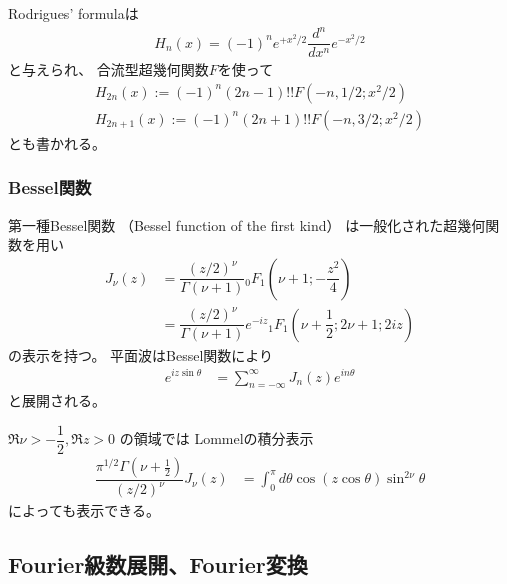 Rodrigues' formulaは
\begin{align}
    H_n(x)
    =
    (-1)^n e^{ + x^2 / 2 }
    \dfrac{d^n}{dx^n}
    e^{ - x^2 / 2 }
\label{hermite rodrigues formula}
\end{align}
と与えられ、
合流型超幾何関数$F$を使って
\begin{subequations}
\begin{align}
    H_{2n}(x)
    :=
        (-1)^n
        (2 n - 1)!!
    F(-n, 1/2; x^2/2)
\\
    H_{2n+1}(x)
    :=
        (-1)^n
        (2 n + 1)!!
    F(-n, 3/2; x^2/2)
\end{align}
\end{subequations}
とも書かれる。

\subsubsection{Bessel関数}

第一種Bessel関数
（Bessel function of the first kind）
は一般化された超幾何関数を用い
\begin{subequations}
\begin{align}
    J_\nu (z)
&=
    \dfrac{ (z/2)^\nu }
        { \Gamma(\nu + 1) }
    {}_0 F_1 \left(
        \nu + 1; - \dfrac{z^2}{4}
    \right)
\\&=
    \dfrac{ (z/2)^\nu }
        { \Gamma(\nu + 1) }
    e^{- i z}
    {}_1 F_1 \left(
        \nu + \dfrac{1}{2};
        2 \nu + 1;
        2 i z
    \right)
\end{align}
\end{subequations}
の表示を持つ。
平面波はBessel関数により
\begin{align}
    e^{ i z \sin \theta }
&=
    \sum_{n = - \infty}^{\infty}
        J_n(z)
        e^{i n \theta}
\label{plane wave expanded by bessel 1st}
\end{align}
と展開される。

$\Re \nu > -\dfrac{1}{2},
\Re z > 0$
の領域では
Lommelの積分表示
\begin{align}
    \dfrac{
        \pi^{1/2}
        \Gamma(\nu + \frac{1}{2})
    }
    {(z/2)^\nu}
    J_{\nu}(z)
&=
    \int_{0}^\pi
        d \theta
        \cos (z \cos \theta)
        \sin^{2 \nu} \theta
\label{lommel integral formula for Bessel 1st}
\end{align}
によっても表示できる。

\newpage
\subsection{Fourier級数展開、Fourier変換}

